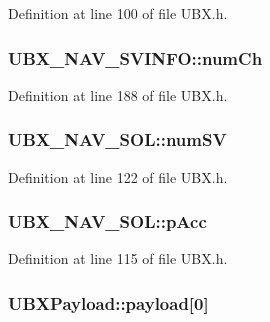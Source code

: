Definition at line 100 of file U\-B\-X.\-h.

\hypertarget{group___g_s_p_module_ga0c11d355a8dcd6cf6687ce19ae052a52}{
\subsubsection[{num\-Ch}]{ U\-B\-X\-\_\-\-N\-A\-V\-\_\-\-S\-V\-I\-N\-F\-O\-::num\-Ch}}\label{group___g_s_p_module_ga0c11d355a8dcd6cf6687ce19ae052a52}


Definition at line 188 of file U\-B\-X.\-h.

\hypertarget{group___g_s_p_module_gab171c210f9cc253577d01441b9e1c439}{
\subsubsection[{num\-S\-V}]{ U\-B\-X\-\_\-\-N\-A\-V\-\_\-\-S\-O\-L\-::num\-S\-V}}\label{group___g_s_p_module_gab171c210f9cc253577d01441b9e1c439}


Definition at line 122 of file U\-B\-X.\-h.

\hypertarget{group___g_s_p_module_gaf472e94738185b263cbfb4bffcca13ff}{
\subsubsection[{p\-Acc}]{ U\-B\-X\-\_\-\-N\-A\-V\-\_\-\-S\-O\-L\-::p\-Acc}}\label{group___g_s_p_module_gaf472e94738185b263cbfb4bffcca13ff}


Definition at line 115 of file U\-B\-X.\-h.

\hypertarget{group___g_s_p_module_ga1aaa9f05bb8d9cec08462c71aedeb224}{
\subsubsection[{payload}]{ U\-B\-X\-Payload\-::payload\mbox{[}0\mbox{]}}}\label{group___g_s_p_module_ga1aaa9f05bb8d9cec08462c71aedeb224}


